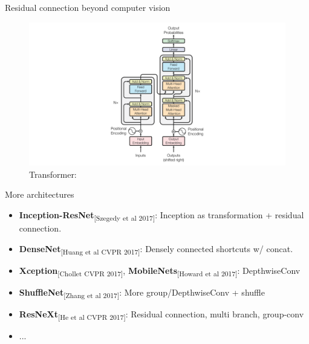 \documentclass[aspectratio=169]{beamer}
\begin{document}
\begin{frame}{Residual connection beyond computer vision}
\begin{figure}
    \centering
    \includegraphics[scale=0.5]{demo/figs/transformer.png}
    \caption{Transformer: }
    \label{fig:wavenet}
\end{figure}
\end{frame}

\begin{frame}{More architectures}
\begin{itemize}
    \item \textbf{Inception-ResNet}\textsubscript{[Szegedy et al 2017]}: Inception as transformation + residual connection.
    \item \textbf{DenseNet}\textsubscript{[Huang et al CVPR 2017]}: Densely connected shortcuts w/ concat.
    \item \textbf{Xception}\textsubscript{[Chollet CVPR 2017]}, \textbf{MobileNets}\textsubscript{[Howard et al 2017]}: DepthwiseConv
    \item \textbf{ShuffleNet}\textsubscript{[Zhang et al 2017]}: More group/DepthwiseConv + shuffle
    \item \textbf{ResNeXt}\textsubscript{[He et al CVPR 2017]}: Residual connection, multi branch, group-conv
    \item ...
\end{itemize}
\end{frame}
\end{document}
